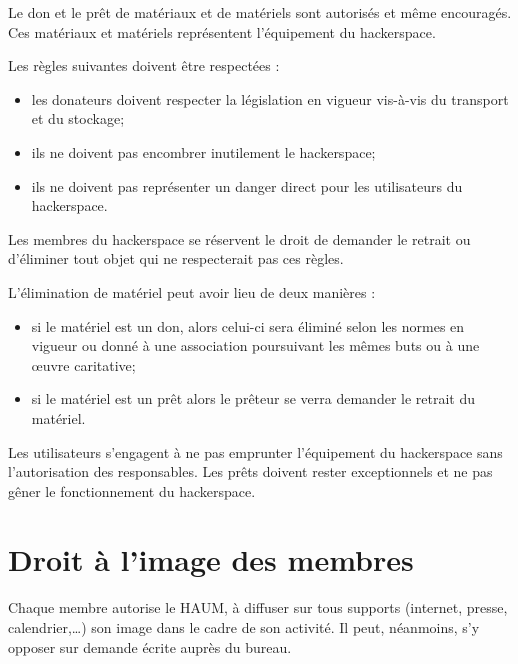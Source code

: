 \documentclass[a4paper, 11pt]{article}
\newcommand{\nomHS}{HAUM}
\begin{document}
Le don et le prêt de matériaux et de matériels sont autorisés et même encouragés. Ces matériaux et matériels représentent l'équipement du hackerspace.

Les règles suivantes doivent être respectées :

\begin{itemize}
    \item les donateurs doivent respecter la législation en vigueur vis-à-vis du transport et du stockage;
    \item ils ne doivent pas encombrer inutilement le hackerspace;
    \item ils ne doivent pas représenter un danger direct pour les utilisateurs du hackerspace.
\end{itemize}

Les membres du hackerspace se réservent le droit de demander le retrait ou d'éliminer tout objet qui ne respecterait pas ces règles.

L'élimination de matériel peut avoir lieu de deux manières :

\begin{itemize}
    \item si le matériel est un don, alors celui-ci sera éliminé selon les normes en vigueur ou donné à une association poursuivant les mêmes buts ou à une \oe{}uvre caritative;
    \item si le matériel est un prêt alors le prêteur se verra demander le retrait du matériel.
\end{itemize}

Les utilisateurs s'engagent à ne pas emprunter l'équipement du hackerspace sans l'autorisation des responsables. Les prêts doivent rester exceptionnels et ne pas gêner le fonctionnement du hackerspace.


\section{Droit à l'image des membres} %

Chaque membre autorise le \nomHS{}, à diffuser sur tous supports (internet, presse, calendrier,\dots{}) son image dans le cadre de son activité. Il peut, néanmoins, s'y opposer sur demande écrite auprès du bureau.

\end{document}
